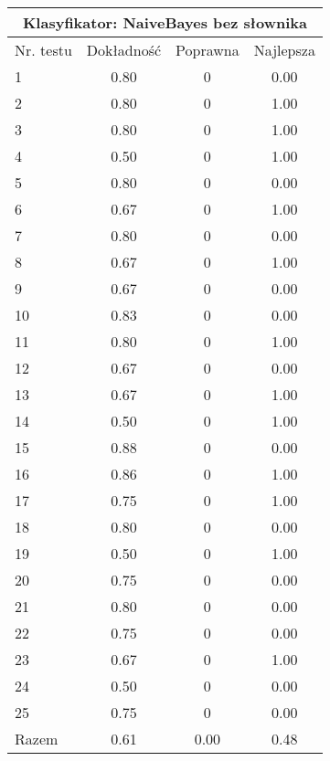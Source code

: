 \documentclass[notitlepage,leqno,fleqn,a4paper]{article}
\begin{document}
\begin{tabular}{|l|c|c|c|}
\hline
\multicolumn{4}{|c|}{Klasyfikator: NaiveBayes bez słownika}\\
\hline
Nr. testu & Dokładność & Poprawna & Najlepsza\\
\hline
1 & 0.80 & 0 & 0.00 \\
2 & 0.80 & 0 & 1.00 \\
3 & 0.80 & 0 & 1.00 \\
4 & 0.50 & 0 & 1.00 \\
5 & 0.80 & 0 & 0.00 \\
6 & 0.67 & 0 & 1.00 \\
7 & 0.80 & 0 & 0.00 \\
8 & 0.67 & 0 & 1.00 \\
9 & 0.67 & 0 & 0.00 \\
10 & 0.83 & 0 & 0.00 \\
11 & 0.80 & 0 & 1.00 \\
12 & 0.67 & 0 & 0.00 \\
13 & 0.67 & 0 & 1.00 \\
14 & 0.50 & 0 & 1.00 \\
15 & 0.88 & 0 & 0.00 \\
16 & 0.86 & 0 & 1.00 \\
17 & 0.75 & 0 & 1.00 \\
18 & 0.80 & 0 & 0.00 \\
19 & 0.50 & 0 & 1.00 \\
20 & 0.75 & 0 & 0.00 \\
21 & 0.80 & 0 & 0.00 \\
22 & 0.75 & 0 & 0.00 \\
23 & 0.67 & 0 & 1.00 \\
24 & 0.50 & 0 & 0.00 \\
25 & 0.75 & 0 & 0.00 \\
\hline
Razem & 0.61 & 0.00 & 0.48 \\
\hline
\end{tabular}
\end{document}
